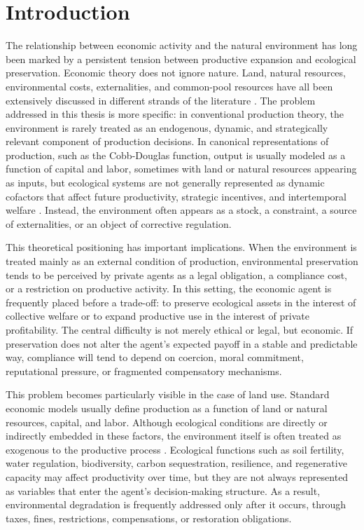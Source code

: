 ﻿
\section{Introduction}

The relationship between economic activity and the natural environment has long been marked by a persistent tension between productive expansion and ecological preservation. Economic theory does not ignore nature. Land, natural resources, environmental costs, externalities, and common-pool resources have all been extensively discussed in different strands of the literature \cite{smith1776, ricardo1817, pigou2010liberty, coase1960social, hardin1968tragedy, ostrom1990commons, dasgupta2001human}. The problem addressed in this thesis is more specific: in conventional production theory, the environment is rarely treated as an endogenous, dynamic, and strategically relevant component of production decisions. In canonical representations of production, such as the Cobb-Douglas function, output is usually modeled as a function of capital and labor, sometimes with land or natural resources appearing as inputs, but ecological systems are not generally represented as dynamic cofactors that affect future productivity, strategic incentives, and intertemporal welfare \cite{cobb1928, jehle2011}. Instead, the environment often appears as a stock, a constraint, a source of externalities, or an object of corrective regulation.

This theoretical positioning has important implications. When the environment is treated mainly as an external condition of production, environmental preservation tends to be perceived by private agents as a legal obligation, a compliance cost, or a restriction on productive activity. In this setting, the economic agent is frequently placed before a trade-off: to preserve ecological assets in the interest of collective welfare or to expand productive use in the interest of private profitability. The central difficulty is not merely ethical or legal, but economic. If preservation does not alter the agent's expected payoff in a stable and predictable way, compliance will tend to depend on coercion, moral commitment, reputational pressure, or fragmented compensatory mechanisms.

This problem becomes particularly visible in the case of land use. Standard economic models usually define production as a function of land or natural resources, capital, and labor. Although ecological conditions are directly or indirectly embedded in these factors, the environment itself is often treated as exogenous to the productive process \cite{jehle2011}. Ecological functions such as soil fertility, water regulation, biodiversity, carbon sequestration, resilience, and regenerative capacity may affect productivity over time, but they are not always represented as variables that enter the agent's decision-making structure. As a result, environmental degradation is frequently addressed only after it occurs, through taxes, fines, restrictions, compensations, or restoration obligations.

